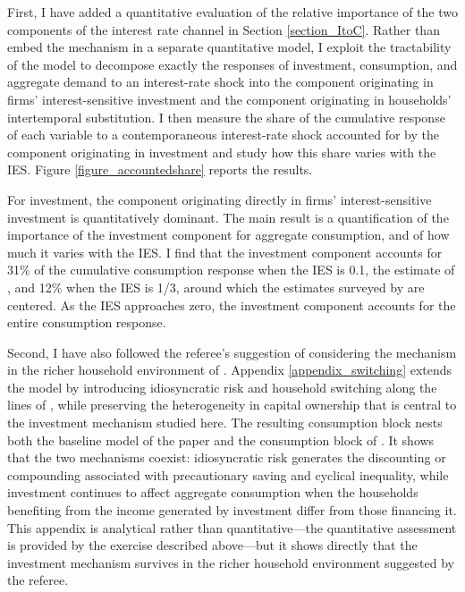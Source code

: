 \documentclass[11pt]{article}
\begin{document}
\begin{enumerate} [  1.]
First, I have added a quantitative evaluation of the relative importance of the two components of the interest rate channel in Section \ref{section_ItoC}. Rather than embed the mechanism in a separate quantitative model, I exploit the tractability of the model to decompose exactly the responses of investment, consumption, and aggregate demand to an interest-rate shock into the component originating in firms' interest-sensitive investment and the component originating in households' intertemporal substitution. I then measure the share of the cumulative response of each variable to a contemporaneous interest-rate shock accounted for by the component originating in investment and study how this share varies with the IES. Figure \ref{figure_accountedshare} reports the results.

For investment, the component originating directly in firms' interest-sensitive investment is quantitatively dominant. The main result is a quantification of the importance of the investment component for aggregate consumption, and of how much it varies with the IES. I find that the investment component accounts for 31\% of the cumulative consumption response when the IES is 0.1, the estimate of \cite{Bestetal2020}, and 12\% when the IES is 1/3, around which the estimates surveyed by \cite{Havranek2015} are centered. As the IES approaches zero, the investment component accounts for the entire consumption response.

Second, I have also followed the referee's suggestion of considering the mechanism in the richer household environment of \cite{Bilbiie2021}. Appendix \ref{appendix_switching} extends the model by introducing idiosyncratic risk and household switching along the lines of \cite{Bilbiie2021}, while preserving the heterogeneity in capital ownership that is central to the investment mechanism studied here. The resulting consumption block nests both the baseline model of the paper and the consumption block of \cite{Bilbiie2021}. It shows that the two mechanisms coexist: idiosyncratic risk generates the discounting or compounding associated with precautionary saving and cyclical inequality, while investment continues to affect aggregate consumption when the households benefiting from the income generated by investment differ from those financing it. This appendix is analytical rather than quantitative---the quantitative assessment is provided by the exercise described above---but it shows directly that the investment mechanism survives in the richer household environment suggested by the referee.


\end{enumerate}
\end{document}
